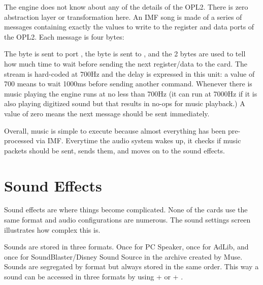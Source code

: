 \par
The engine does not know about any of the details of the OPL2. There is zero abstraction layer or transformation here. An IMF song is made of a series of messages containing exactly the values to write to the register and data ports of the OPL2. Each message is four bytes:\\
\par
\begin{minipage}{\textwidth}

\end{minipage}
\par
The  byte is sent to port , the  byte is sent to , and the  2 bytes are used to tell how much time to wait before sending the next register/data to the card. The stream is hard-coded at 700Hz and the delay is expressed in this unit: a value of 700 means to wait 1000ms before sending another command. Whenever there is music playing the engine runs at no less than 700Hz (it can run at 7000Hz if it is also playing digitized sound but that results in no-ops for music playback.) A value of zero means the next message should be sent immediately.\\
\par
Overall, music is simple to execute because almost everything has been pre-processed via IMF. Everytime the audio system wakes up, it checks if music packets should be sent, sends them, and moves on to the sound effects.










\section{Sound Effects}
Sound effects are where things become complicated. None of the cards use the same format and audio configurations are numerous. The sound settings screen illustrates how complex this is.
\par
\begin{figure}[H]
\centering
 \end{figure}
\par
Sounds are stored in three formats. Once for PC Speaker, once for AdLib, and once for SoundBlaster/Disney Sound Source in the  archive created by Muse. Sounds are segregated by format but always stored in the same order. This way a sound can be accessed in three formats by using  +  or  + .\\


